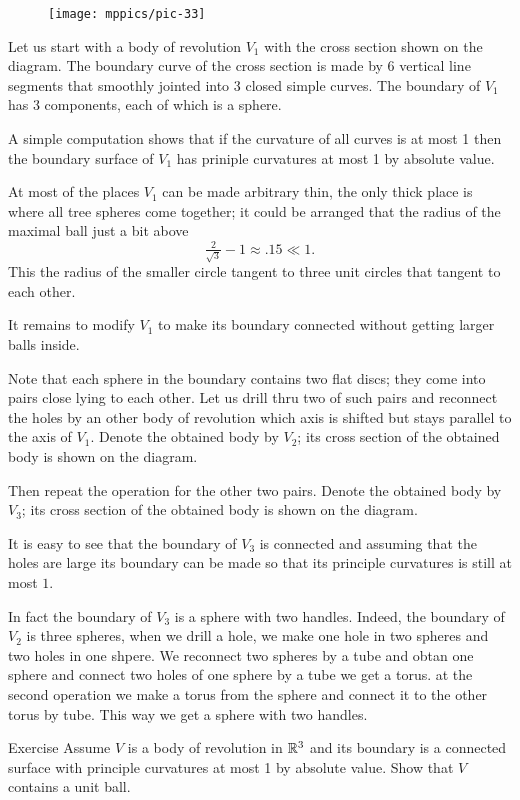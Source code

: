 \begin{figure}%
\centering
\texttt{[image: mppics/pic-33]}
\vskip0mm
\end{figure}

Let us start with a body of revolution $V_1$ with the cross section shown on the diagram.
The boundary curve of the cross section is made by 6 vertical line segments that smoothly jointed into 3 closed simple curves. 
The boundary of $V_1$ has 3 components, each of which is a sphere.

A simple computation shows that if the curvature of all curves is at most 1 then the boundary surface of $V_1$ has priniple curvatures at most 1 by absolute value.

At most of the places $V_1$ can be made arbitrary thin,
the only thick place is where all tree spheres come together;
it could be arranged that the radius of the maximal ball just a bit above 
\[\tfrac2{\sqrt{3}}-1\approx .15\ll1.\]
This the radius of the smaller circle tangent to three unit circles that tangent to each other.


It remains to modify $V_1$ to make its boundary connected without  getting larger balls inside.

Note that each sphere in the boundary contains two flat discs;
they come into pairs close lying to each other. 
Let us drill thru two of such pairs and reconnect the holes by an other body of revolution which axis is shifted but stays parallel to the axis of $V_1$.
Denote the obtained body by $V_2$; its cross section of the obtained body is shown on the diagram. 

Then repeat the operation for the other two pairs.
Denote the obtained body by $V_3$; its cross section of the obtained body is shown on the diagram.

It is easy to see that the boundary of $V_3$ is connected
and assuming that the holes are large its boundary can be made so that its principle curvatures is still at most $1$.
\qeds

In fact the boundary of $V_3$ is a sphere with two handles.
Indeed, the boundary of $V_2$ is three spheres,
when we drill a hole, we make one hole in two spheres and two holes in one shpere.
We reconnect two spheres by a tube and obtan one sphere
and connect two holes of one sphere by a tube we get a torus.
at the second operation we make a torus from the sphere and connect it to the other torus by tube.
This way we get a sphere with two handles.

\begin{thm}{Exercise}
Assume $V$ is a body of revolution in $\mathbb{R}^3$ and its boundary is a connected surface with principle curvatures at most 1 by absolute value.
Show that $V$ contains a unit ball.
\end{thm}






